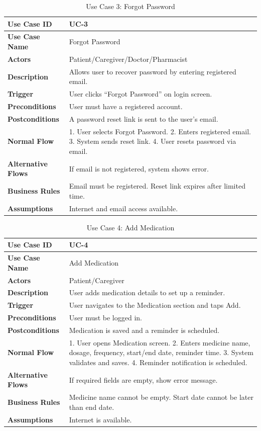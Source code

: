 \documentclass[12pt, a4paper, oneside]{report}
\begin{document}
\begin{table}[H]
\centering
\caption{Use Case 3: Forgot Password}
\begin{tabularx}{\textwidth}{|l|X|}
\hline
\textbf{Use Case ID} & UC-3 \\ \hline
\textbf{Use Case Name} & Forgot Password \\ \hline
\textbf{Actors} & Patient/Caregiver/Doctor/Pharmacist \\ \hline
\textbf{Description} & Allows user to recover password by entering registered email. \\ \hline
\textbf{Trigger} & User clicks ``Forgot Password'' on login screen. \\ \hline
\textbf{Preconditions} & User must have a registered account. \\ \hline
\textbf{Postconditions} & A password reset link is sent to the user's email. \\ \hline
\textbf{Normal Flow} & 1. User selects Forgot Password. 2. Enters registered email. 3. System sends reset link. 4. User resets password via email. \\ \hline
\textbf{Alternative Flows} & If email is not registered, system shows error. \\ \hline
\textbf{Business Rules} & Email must be registered. Reset link expires after limited time. \\ \hline
\textbf{Assumptions} & Internet and email access available. \\ \hline
\end{tabularx}
\end{table}

\begin{table}[H]
\centering
\caption{Use Case 4: Add Medication}
\begin{tabularx}{\textwidth}{|l|X|}
\hline
\textbf{Use Case ID} & UC-4 \\ \hline
\textbf{Use Case Name} & Add Medication \\ \hline
\textbf{Actors} & Patient/Caregiver \\ \hline
\textbf{Description} & User adds medication details to set up a reminder. \\ \hline
\textbf{Trigger} & User navigates to the Medication section and taps Add. \\ \hline
\textbf{Preconditions} & User must be logged in. \\ \hline
\textbf{Postconditions} & Medication is saved and a reminder is scheduled. \\ \hline
\textbf{Normal Flow} & 1. User opens Medication screen. 2. Enters medicine name, dosage, frequency, start/end date, reminder time. 3. System validates and saves. 4. Reminder notification is scheduled. \\ \hline
\textbf{Alternative Flows} & If required fields are empty, show error message. \\ \hline
\textbf{Business Rules} & Medicine name cannot be empty. Start date cannot be later than end date. \\ \hline
\textbf{Assumptions} & Internet is available. \\ \hline
\end{tabularx}
\end{table}
\end{document}
